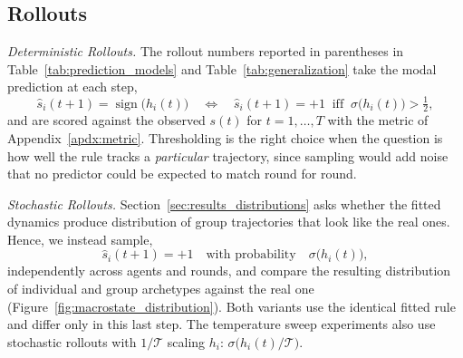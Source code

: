 \subsection{Rollouts}\label{apdx:rollouts}



\textit{Deterministic Rollouts.} The rollout numbers reported in parentheses in
Table~\ref{tab:prediction_models} and Table~\ref{tab:generalization} take the modal prediction
at each step,
\[
\hat s_i(t{+}1) = \operatorname{sign}\!\big(h_i(t)\big)
\quad\Longleftrightarrow\quad
\hat s_i(t{+}1) = +1 \ \text{ iff } \ \sigma\big(h_i(t)\big) > \tfrac12 ,
\]
and are scored against the observed $s(t)$ for $t = 1,\dots,T$ with the metric of
Appendix~\ref{apdx:metric}. Thresholding is the right choice when the question is how well the
rule tracks a \emph{particular} trajectory, since sampling would add noise that no predictor
could be expected to match round for round.

\textit{Stochastic Rollouts.} Section~\ref{sec:results_distributions}
asks whether the fitted dynamics produce distribution of group trajectories that look like the
real ones. Hence, we instead sample,
\[
\hat s_i(t{+}1) = +1 \quad\text{with probability}\quad \sigma\big(h_i(t)\big),
\]
independently across agents and rounds, and compare the resulting distribution of individual and
group archetypes against the real one (Figure~\ref{fig:macrostate_distribution}). Both
variants use the identical fitted rule and differ only in this last step. The temperature sweep experiments also use stochastic rollouts with $1/\mathcal{T}$ scaling $h_i$: $\sigma\big(h_i(t) /\mathcal{T}\big)$.
